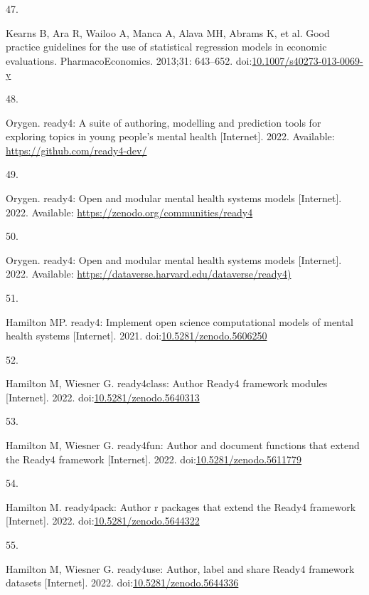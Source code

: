 \documentclass[
]{article}
\newlength{\cslhangindent}
\newlength{\csllabelwidth}
\newlength{\cslentryspacingunit} %
\newenvironment{CSLReferences}[2] %
 {%
  \setlength{\parindent}{0pt}
  \ifodd #1
  \let\oldpar\par
  \def\par{\hangindent=\cslhangindent\oldpar}
  \fi
  \setlength{\parskip}{#2\cslentryspacingunit}
 }%
 {}
\newcommand{\CSLLeftMargin}[1]{\parbox[t]{\csllabelwidth}{#1}}
\newcommand{\CSLRightInline}[1]{\parbox[t]{\linewidth - \csllabelwidth}{#1}\break}
\begin{document}
\begin{CSLReferences}{0}{0}
\leavevmode{}%
\CSLLeftMargin{47. }%
\CSLRightInline{Kearns B, Ara R, Wailoo A, Manca A, Alava MH, Abrams K, et al. Good practice guidelines for the use of statistical regression models in economic evaluations. PharmacoEconomics. 2013;31: 643--652. doi:\href{https://doi.org/10.1007/s40273-013-0069-y}{10.1007/s40273-013-0069-y}}

\leavevmode{}%
\CSLLeftMargin{48. }%
\CSLRightInline{Orygen. ready4: A suite of authoring, modelling and prediction tools for exploring topics in young people's mental health {[}Internet{]}. 2022. Available: \url{https://github.com/ready4-dev/}}

\leavevmode{}%
\CSLLeftMargin{49. }%
\CSLRightInline{Orygen. ready4: Open and modular mental health systems models {[}Internet{]}. 2022. Available: \url{https://zenodo.org/communities/ready4}}

\leavevmode{}%
\CSLLeftMargin{50. }%
\CSLRightInline{Orygen. ready4: Open and modular mental health systems models {[}Internet{]}. 2022. Available: \url{https://dataverse.harvard.edu/dataverse/ready4)}}

\leavevmode{}%
\CSLLeftMargin{51. }%
\CSLRightInline{Hamilton MP. ready4: Implement open science computational models of mental health systems {[}Internet{]}. 2021. doi:\href{https://doi.org/10.5281/zenodo.5606250}{10.5281/zenodo.5606250}}

\leavevmode{}%
\CSLLeftMargin{52. }%
\CSLRightInline{Hamilton M, Wiesner G. ready4class: Author Ready4 framework modules {[}Internet{]}. 2022. doi:\href{https://doi.org/10.5281/zenodo.5640313}{10.5281/zenodo.5640313}}

\leavevmode{}%
\CSLLeftMargin{53. }%
\CSLRightInline{Hamilton M, Wiesner G. ready4fun: Author and document functions that extend the Ready4 framework {[}Internet{]}. 2022. doi:\href{https://doi.org/10.5281/zenodo.5611779}{10.5281/zenodo.5611779}}

\leavevmode{}%
\CSLLeftMargin{54. }%
\CSLRightInline{Hamilton M. ready4pack: Author r packages that extend the Ready4 framework {[}Internet{]}. 2022. doi:\href{https://doi.org/10.5281/zenodo.5644322}{10.5281/zenodo.5644322}}

\leavevmode{}%
\CSLLeftMargin{55. }%
\CSLRightInline{Hamilton M, Wiesner G. ready4use: Author, label and share Ready4 framework datasets {[}Internet{]}. 2022. doi:\href{https://doi.org/10.5281/zenodo.5644336}{10.5281/zenodo.5644336}}


\end{CSLReferences}
\end{document}
